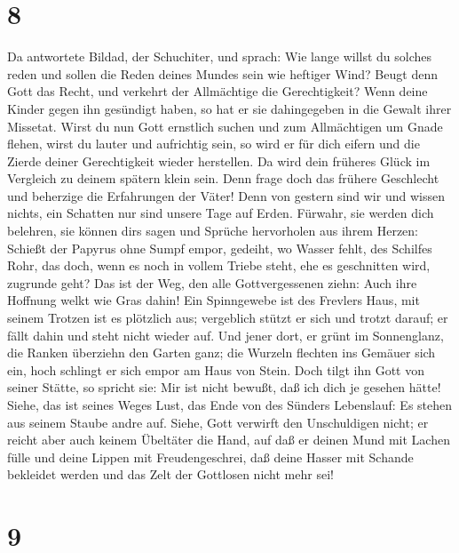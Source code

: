 \hypertarget{section-7}{%
\section{8}\label{section-7}}

 Da antwortete Bildad, der Schuchiter, und sprach:
 Wie lange willst du solches reden und sollen die Reden
deines Mundes sein wie heftiger Wind?  Beugt denn Gott das
Recht, und verkehrt der Allmächtige die Gerechtigkeit? 
Wenn deine Kinder gegen ihn gesündigt haben, so hat er sie dahingegeben
in die Gewalt ihrer Missetat.  Wirst du nun Gott ernstlich
suchen und zum Allmächtigen um Gnade flehen,  wirst du
lauter und aufrichtig sein, so wird er für dich eifern und die Zierde
deiner Gerechtigkeit wieder herstellen.  Da wird dein
früheres Glück im Vergleich zu deinem spätern klein sein. 
Denn frage doch das frühere Geschlecht und beherzige die Erfahrungen der
Väter!  Denn von gestern sind wir und wissen nichts, ein
Schatten nur sind unsere Tage auf Erden.  Fürwahr, sie
werden dich belehren, sie können dir\textquotesingle s sagen und Sprüche
hervorholen aus ihrem Herzen:  Schießt der Papyrus ohne
Sumpf empor, gedeiht, wo Wasser fehlt, des Schilfes Rohr,
 das doch, wenn es noch in vollem Triebe steht, ehe es
geschnitten wird, zugrunde geht?  Das ist der Weg, den
alle Gottvergessenen ziehn: Auch ihre Hoffnung welkt wie Gras dahin!
 Ein Spinngewebe ist des Frevlers Haus, mit seinem
Trotzen ist es plötzlich aus;  vergeblich stützt er sich
und trotzt darauf; er fällt dahin und steht nicht wieder auf.
 Und jener dort, er grünt im Sonnenglanz, die Ranken
überziehn den Garten ganz;  die Wurzeln flechten ins
Gemäuer sich ein, hoch schlingt er sich empor am Haus von Stein.
 Doch tilgt ihn Gott von seiner Stätte, so spricht sie:
Mir ist nicht bewußt, daß ich dich je gesehen hätte! 
Siehe, das ist seines Weges Lust, das Ende von des Sünders Lebenslauf:
Es stehen aus seinem Staube andre auf.  Siehe, Gott
verwirft den Unschuldigen nicht; er reicht aber auch keinem Übeltäter
die Hand,  auf daß er deinen Mund mit Lachen fülle und
deine Lippen mit Freudengeschrei,  daß deine Hasser mit
Schande bekleidet werden und das Zelt der Gottlosen nicht mehr sei!

\hypertarget{section-8}{%
\section{9}\label{section-8}}

